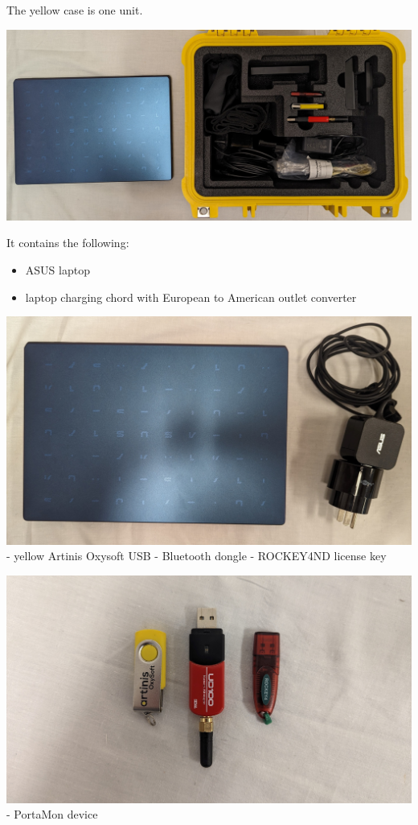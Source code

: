 \documentclass[
]{book}
\providecommand{\tightlist}{%
  \setlength{\itemsep}{0pt}\setlength{\parskip}{0pt}}
\begin{document}
The yellow case is one unit.

\includegraphics[width=1\linewidth]{images/portamon/portamoncase}

It contains the following:

\begin{itemize}
\tightlist
\item
  ASUS laptop
\item
  laptop charging chord with European to American outlet converter
\end{itemize}

\includegraphics[width=1\linewidth]{images/portamon/asuslaptopandcharger}
- yellow Artinis Oxysoft USB
- Bluetooth dongle
- ROCKEY4ND license key

\includegraphics[width=1\linewidth]{images/portamon/laptopplugins}
- PortaMon device
\end{document}

